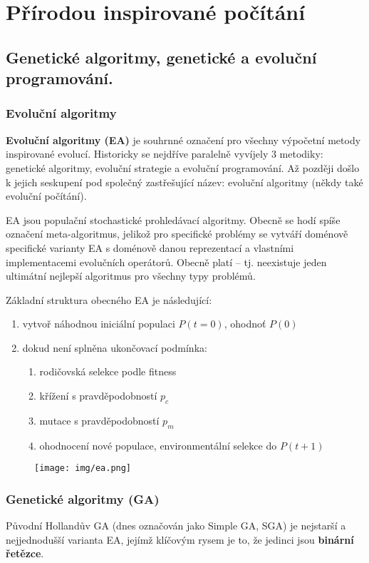 \chapter{Přírodou inspirované počítání}
\section{Genetické algoritmy, genetické a evoluční programování.}
\subsection{Evoluční algoritmy}
\label{ea}
\textbf{Evoluční algoritmy (EA)} je souhrnné označení pro všechny výpočetní metody inspirované evolucí. Historicky se nejdříve paralelně vyvíjely 3 metodiky: genetické algoritmy, evoluční strategie a evoluční programování. Až později došlo k jejich seskupení pod společný zastřešující název: evoluční algoritmy (někdy také evoluční počítání).

EA jsou populační stochastické prohledávací algoritmy. Obecně se hodí spíše označení meta-algoritmus, jelikož pro specifické problémy se vytváří doménově specifické varianty EA s doménově danou reprezentací a vlastními implementacemi evolučních operátorů. Obecně platí  -- tj. neexistuje jeden ultimátní nejlepší algoritmus pro všechny typy problémů.

Základní struktura obecného EA je následující:
\begin{enumerate}
	
	
	\item vytvoř náhodnou iniciální populaci $P(t=0)$, ohodnoť $P(0)$
	\item dokud není splněna ukončovací podmínka:
	\begin{enumerate}
		
		
		\item rodičovská selekce podle fitness
		\item křížení s pravděpodobností $p_c$
		\item mutace s pravděpodobností $p_m$
		\item ohodnocení nové populace, environmentální selekce do $P(t+1)$
	\end{enumerate}
\end{enumerate}
\begin{figure}[H]
	\centering
	\texttt{[image: img/ea.png]}
\end{figure}

\subsection{Genetické algoritmy (GA)}
Původní Hollandův GA (dnes označován jako Simple GA, SGA) je nejstarší a nejjednodušší varianta EA, jejímž klíčovým rysem je to, že jedinci jsou \textbf{binární řetězce}.

